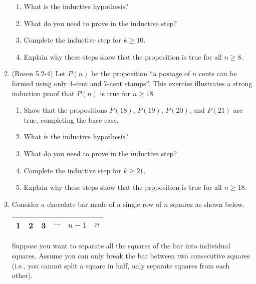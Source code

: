 \begin{enumerate}
\begin{enumerate}
\item \streasy What is the inductive hypothesis?

\item \streasy What do you need to prove in the inductive step?

\item \strhard Complete the inductive step for $k \geq 10$.
  
\item \strmedium Explain why these steps show that the proposition is true for all $n \geq 8$.
\end{enumerate}

\item (Rosen 5.2-4) Let $P(n)$ be the proposition ``a postage of $n$ cents can be formed using only 4-cent and 7-cent stamps''. This exercise illustrates a strong induction proof that $P(n)$ is true for $n \geq 18$.

\begin{enumerate}
\item \streasy Show that the propositions $P(18)$, $P(19)$, $P(20)$, and $P(21)$ are true, completing the base case.

\item \streasy What is the inductive hypothesis?

\item \streasy What do you need to prove in the inductive step?

\item \strhard Complete the inductive step for $k \geq 21$.
  
\item \strmedium Explain why these steps show that the proposition is true for all $n \geq 18$.
\end{enumerate}

\item \strmedium Consider a chocolate bar made of a single row of $n$ squares as shown below.

\begin{center}
\begin{tabular}{|C{8mm}||C{8mm}||C{8mm}||C{8mm}||C{8mm}||C{8mm}|}
 & 2 & 3 & $\cdots$ & $n{-}1$ & $n$ \\
\hline 
\end{tabular}
\end{center}

Suppose you want to separate all the squares of the bar into individual squares. Assume you can only break the bar between two consecutive squares (i.e., you cannot split a square in half, only separate squares from each other).


\end{enumerate}
